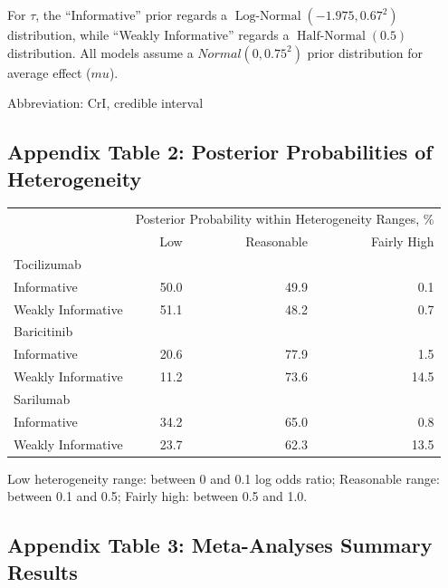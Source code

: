 \documentclass[
  12pt,
]{article}
\begin{document}
For \(\tau\), the ``Informative'' prior regards a
\(\operatorname{Log-Normal}(-1.975, 0.67^2)\) distribution, while
``Weakly Informative'' regards a \(\operatorname{Half-Normal}(0.5)\)
distribution. All models assume a \(Normal(0, 0.75^2)\) prior
distribution for average effect (\(mu\)).

Abbreviation: CrI, credible interval

\newpage

\hypertarget{appendix-table-2-posterior-probabilities-of-heterogeneity}{%
\subsection{Appendix Table 2: Posterior Probabilities of
Heterogeneity}\label{appendix-table-2-posterior-probabilities-of-heterogeneity}}

\captionsetup[table]{labelformat=empty,skip=1pt}
\begin{longtable}{lrrr}
\toprule
 & \multicolumn{3}{c}{Posterior Probability within Heterogeneity Ranges, \%} \\ 
 \cmidrule(lr){2-4}
 & Low & Reasonable & Fairly High \\ 
\midrule
\multicolumn{1}{l}{Tocilizumab} \\ 
\midrule
Informative & 50.0 & 49.9 & 0.1 \\ 
Weakly Informative & 51.1 & 48.2 & 0.7 \\ 
\midrule
\multicolumn{1}{l}{Baricitinib} \\ 
\midrule
Informative & 20.6 & 77.9 & 1.5 \\ 
Weakly Informative & 11.2 & 73.6 & 14.5 \\ 
\midrule
\multicolumn{1}{l}{Sarilumab} \\ 
\midrule
Informative & 34.2 & 65.0 & 0.8 \\ 
Weakly Informative & 23.7 & 62.3 & 13.5 \\ 
 \bottomrule
\end{longtable}
\begin{minipage}{\linewidth}
Low heterogeneity range: between 0 and 0.1 log odds ratio; Reasonable range: between 0.1 and 0.5; Fairly high: between 0.5 and 1.0.\\ 
\end{minipage}

\newpage

\hypertarget{appendix-table-3-meta-analyses-summary-results}{%
\subsection{Appendix Table 3: Meta-Analyses Summary
Results}\label{appendix-table-3-meta-analyses-summary-results}}
\end{document}
